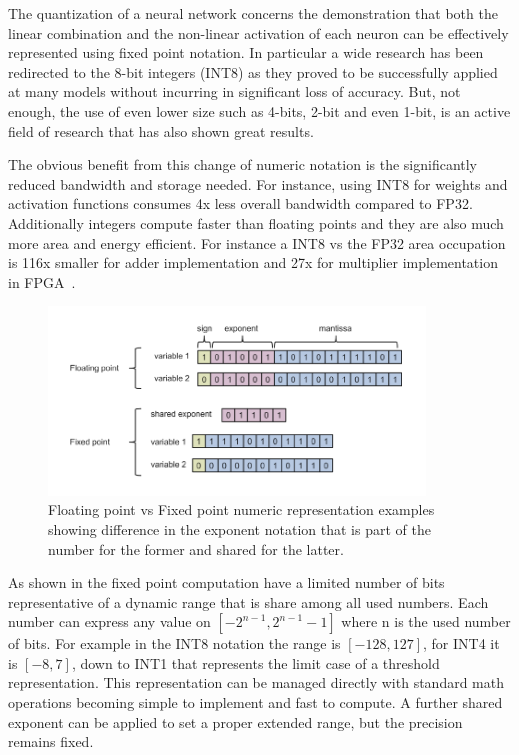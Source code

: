 The quantization of a neural network concerns the demonstration that both the linear combination and the non-linear activation of each neuron can be effectively represented using fixed point notation.
In particular a wide research has been redirected to the 8-bit integers (INT8) as they proved to be successfully applied at many models without incurring in significant loss of accuracy.
But, not enough, the use of even lower size such as 4-bits, 2-bit and even 1-bit, is an active field of research that has also shown great results.

The obvious benefit from this change of numeric notation is the significantly reduced bandwidth and storage needed. For instance, using INT8 for weights and activation functions consumes 4x less overall bandwidth compared to FP32.
Additionally integers compute faster than floating points and they are also much more area and energy efficient.
For instance a INT8 vs the FP32 area occupation is 116x smaller for adder implementation and 27x for multiplier implementation in FPGA~\cite{choukroun2019lowbit}.

\begin{figure}
    \centering
    \includegraphics[width=10cm]{img/4_EmbeddedML/FLOATP_vs_FIXEDP.png}
    \caption{Floating point vs Fixed point numeric representation examples showing difference in the exponent notation that is part of the number for the former and shared for the latter.}
    \label{fig:floatp_vs_fixedp}
\end{figure}

As shown in \Figure{\ref{fig:floatp_vs_fixedp}} the fixed point computation have a limited number of bits representative of a dynamic range that is share among all used numbers. Each number can express any value on $[-2^{n-1}, 2^{n-1}-1]$ where n is the used number of bits. For example in the INT8 notation the range is $[-128,127]$, for INT4 it is $[-8,7]$, down to INT1 that represents the limit case of a threshold representation. 
This representation can be managed directly with standard math operations becoming simple to implement and fast to compute.
A further shared exponent can be applied to set a proper extended range, but the precision remains fixed.

